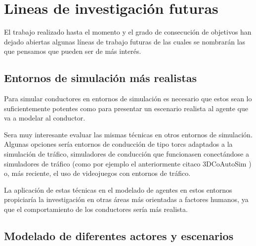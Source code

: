 \chapter{Lineas de investigación futuras}
\label{ch:future-work}

El trabajo realizado hasta el momento y el grado de consecución de objetivos han dejado abiertas algunas líneas de trabajo futuras de las cuales se nombrarán las que pensamos que pueden ser de más interés.

\section{Entornos de simulación más realistas}

Para simular conductores en entornos de simulación es necesario que estos sean lo suficientemente potentes como para presentar un escenario realista al agente que va a modelar al conductor.

Sera muy interesante evaluar las mismas técnicas en otros entornos de simulación. Algunas opciones sería entornos de conducción de tipo \ac{torcs} adaptados a la simulación de tráfico, simuladores de conducción que funcionasen conectándose a simuladores de tráfico (como por ejemplo el anteriormente citaco 3DCoAutoSim \cite{olaverri2018implementation}) o, más reciente, el uso de videojuegos con entornos de tráfico.

La aplicación de estas técnicas en el modelado de agentes en estos entornos propiciaría la investigación en otras áreas más orientadas a factores humanos, ya que el comportamiento de los conductores sería más realista.

\section{Modelado de diferentes actores y escenarios}


